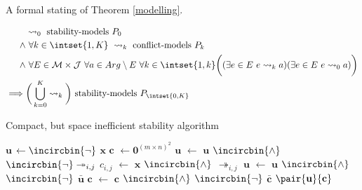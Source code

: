 A formal stating of Theorem \ref{modelling}.

\begin{align*}
&\rightsquigarrow_0\text{ stability-models }P_0\\
\land&\ \forall k\in\intset{1,K}\ \rightsquigarrow_k\text{ conflict-models }P_k\\
\land&\ \forall E\in\mathcal{M}\times\mathcal{J}\ \forall a\in Arg\setminus E\ \forall k\in\intset{1,k}\bigg((\exists e\in E\ e\rightsquigarrow_k a)(\exists e\in E\ e\rightsquigarrow_0 a)\bigg)\\
\implies&\bigg(\bigcup_{k=0}^K\rightsquigarrow_k\bigg)\text{ stability-models }P_{\intset{0,K}}
\end{align*}

\begin{algorithm}[H]
	\caption{Compact, but space inefficient stability algorithm}
	\begin{algorithmic}[1]
		\State $\mathbf{u}$ $\gets\incircbin{\neg}$ $\mathbf{x}$
		\State $\mathbf{c}$ $\gets\mathbf{0}^{(m\times n)^2}$
		\State $\mathbf{u}$ $\gets$ $\mathbf{u}$ $\incircbin{\land}$ $\incircbin{\neg}\twoheadrightarrow_{i,j}$
		\State $c_{i,j}$ $\gets$ $\mathbf{x}$ $\incircbin{\land}$ $\twoheadrightarrow_{i,j}$ 
		\EndIf
		\EndFor			
		\State $\mathbf{u}$ $\gets$ $\mathbf{u}$ $\incircbin{\land}$ $\incircbin{\neg}$ $\bar{\mathbf{u}}$
		\State $\mathbf{c}$ $\gets$ $\mathbf{c}$ $\incircbin{\land}$ $\incircbin{\neg}$ $\bar{\mathbf{c}}$
		\State \Return $\pair{\mathbf{u}}{\mathbf{c}}$
		\EndFunction
	\end{algorithmic}
\end{algorithm}